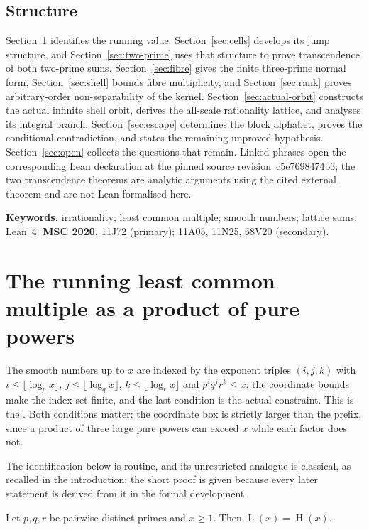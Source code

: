 \documentclass[11pt]{article}
\renewcommand{\commitshort}{c5e7698474b3}
\newcommand{\hgt}{\operatorname{H}}
\newcommand{\Lprefix}{\operatorname{L}}
\begin{document}
\subsection*{Structure}
Section~\ref{sec:lcm} identifies the running value.
Section~\ref{sec:cells} develops its jump structure, and
Section~\ref{sec:two-prime} uses that structure to prove transcendence of both
two-prime sums.  Section~\ref{sec:fibre} gives the finite
three-prime normal form, Section~\ref{sec:shell} bounds fibre multiplicity, and
Section~\ref{sec:rank} proves arbitrary-order non-separability of the kernel.
Section~\ref{sec:actual-orbit} constructs the actual infinite shell orbit,
derives the all-scale rationality lattice, and analyses its integral branch.
Section~\ref{sec:escape} determines the block alphabet, proves the conditional
contradiction, and states the remaining unproved hypothesis.
Section~\ref{sec:open} collects the questions that remain.  Linked phrases open
the corresponding Lean declaration at the pinned source
revision~\commitshort; the two transcendence theorems are analytic arguments
using the cited external theorem and are not Lean-formalised here.

\medskip
\noindent\textbf{Keywords.} irrationality; least common multiple; smooth
numbers; lattice sums; Lean~4.
\qquad
\textbf{MSC 2020.} 11J72 (primary); 11A05, 11N25, 68V20 (secondary).

\section{The running least common multiple as a product of pure powers}\label{sec:lcm}

The smooth numbers up to $x$ are indexed by the exponent triples $(i,j,k)$ with
$i\le\lfloor\log_p x\rfloor$, $j\le\lfloor\log_q x\rfloor$,
$k\le\lfloor\log_r x\rfloor$ and $p^{i}q^{j}r^{k}\le x$: the coordinate bounds
make the index set finite, and the last condition is the actual constraint.
This is the
.  Both conditions matter: the coordinate box is strictly
larger than the prefix, since a product of three large pure powers can exceed
$x$ while each factor does not.

The identification below is routine, and its unrestricted analogue is classical,
as recalled in the introduction; the short proof is given because every later
statement is derived from it in the formal development.

\begin{theorem}\label{res:lcm}
Let $p,q,r$ be pairwise distinct primes and $x\ge1$.  Then
$\Lprefix(x)=\hgt(x)$.
\end{theorem}
\end{document}
